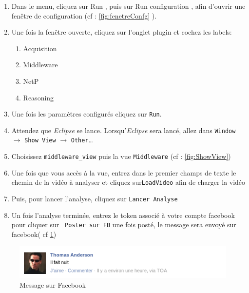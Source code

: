 \begin{enumerate}
 \item Dans le menu, cliquez sur \og Run \fg, puis sur \og Run configuration \fg, 
afin d'ouvrir une fenêtre de configuration (cf : \ref{fig:fenetreConfg} ).
  \item Une fois la fenêtre ouverte, cliquez sur l'onglet plugin et cochez les labels:
  \begin{enumerate}
      \item Acquisition
      \item Middleware
      \item NetP
      \item Reasoning
      \end{enumerate}
      \item Une fois les paramètres configurés cliquez sur \verb+Run+.
      \item Attendez que \emph{Eclipse} se lance. Lorsqu'\emph{Eclipse} sera lancé, allez dans \verb+Window+ $\rightarrow$ \verb+Show View+ $\rightarrow$ \verb+Other+\dots
      \item Choisissez \verb+middleware_view+ puis la vue \verb+Middleware+ (cf : \ref{fig:ShowView})
      \item Une fois que vous accès à la vue, entrez dans le premier champs de texte le chemin de la vidéo à analyser et cliquez sur\verb+LoadVideo+ afin de charger la vidéo
      \item Puis, pour lancer l'analyse, cliquez sur \verb+Lancer Analyse+
      \item Un fois l'analyse terminée, entrez le token associé à votre compte facebook pour cliquer sur \verb+ Poster sur FB+ une fois posté, le message sera envoyé sur facebook( cf \ref{fig:messageFB})
  \end{enumerate}
\begin{figure}[h]
	  \centering
	  \includegraphics[scale=0.5]{img/cestlanuit}
	  \caption{Message sur Facebook}
	  \label{fig:messageFB}
\end{figure}
